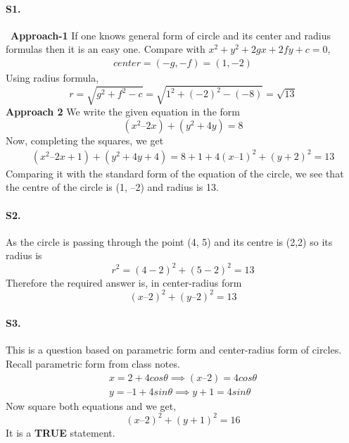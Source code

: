 \documentclass{article}
\begin{document}
\paragraph{S1.}\
\textbf{Approach-1} If one knows general form of circle and its center and radius formulas then it is an easy one. Compare with $x^2+y^2+2gx+2fy+c=0$,
\begin{align*}
    center=(-g,-f)=(1,-2)
\end{align*}
Using radius formula,
\begin{equation*}
    r=\sqrt{g^2+f^2-c}=\sqrt{1^2+(-2)^2-(-8)}=\sqrt{13}
\end{equation*}
\textbf{Approach 2}
We write the given equation in the form $$(x^2 – 2x) + ( y^2 + 4y) = 8$$
Now, completing the squares, we get
\begin{align*}
    (x^2 – 2x + 1) + ( y^2 + 4y + 4) = 8 + 1 + 4
    (x – 1)^2 + (y + 2)^2 = 13
\end{align*}
Comparing it with the standard form of the equation of the circle, we see that the
centre of the circle is (1, –2) and radius is 13.

\paragraph{S2.}
 As the circle is passing through the point (4, 5) and its centre is (2,2) so its radius is
 $$ r^2=(4 - 2)^2 + (5 - 2)^2 = 13$$
 Therefore the required answer is, in center-radius form
\begin{equation*}
    (x – 2)^2 + (y – 2)^2 = 13
\end{equation*}

\paragraph{S3.}
This is a question based on parametric form and center-radius form of circles. Recall parametric form from class notes.
\begin{align*}
    x=2 + 4 cos\theta \implies (x – 2) = 4 cos\theta \\
    y = –1 + 4 sin\theta \implies y + 1 = 4 sin\theta
\end{align*}
Now square both equations and we get,
\begin{equation*}
    (x – 2)^2 + (y + 1)^2 = 16
\end{equation*}
It is a \textbf{TRUE} statement.
\end{document}
